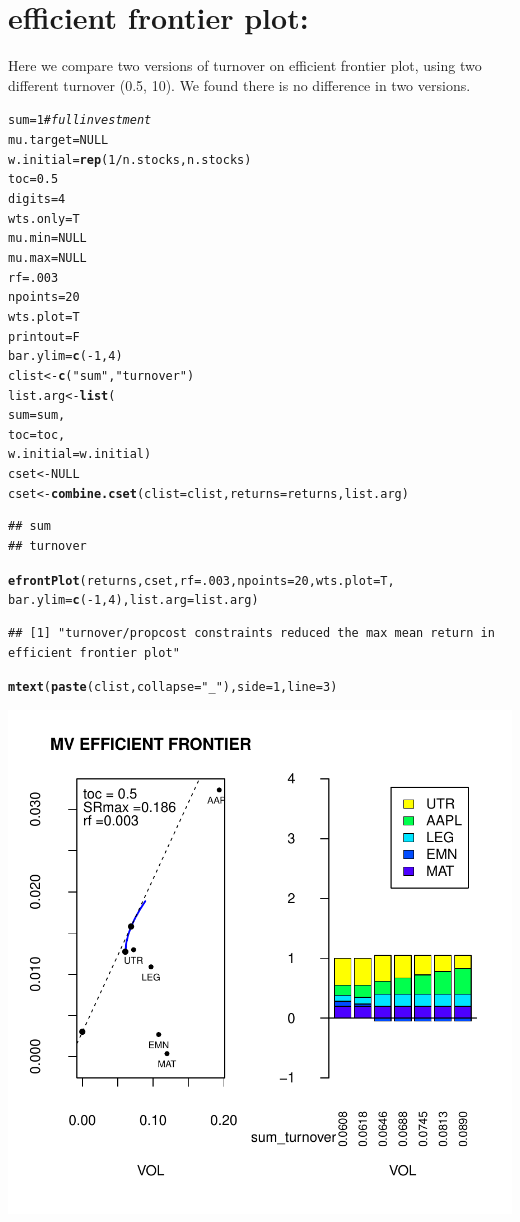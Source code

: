 \documentclass{uwstat518}\usepackage[]{graphicx}\usepackage[]{color}
\makeatletter
\def\maxwidth{ %
  \ifdim\Gin@nat@width>\linewidth
    \linewidth
  \else
    \Gin@nat@width
  \fi
}
\newcommand{\hlstr}[1]{\textcolor[rgb]{0.192,0.494,0.8}{#1}}%
\newcommand{\hlcom}[1]{\textcolor[rgb]{0.678,0.584,0.686}{\textit{#1}}}%
\newcommand{\hlkwd}[1]{\textcolor[rgb]{0.737,0.353,0.396}{\textbf{#1}}}%
\newenvironment{kframe}{%
 \def\at@end@of@kframe{}%
 \ifinner\ifhmode%
  \def\at@end@of@kframe{\end{minipage}}%
  \begin{minipage}{\columnwidth}%
 \fi\fi%
 \def\FrameCommand##1{\hskip\@totalleftmargin \hskip-\fboxsep
 \colorbox{shadecolor}{##1}\hskip-\fboxsep
     \hskip-\linewidth \hskip-\@totalleftmargin \hskip\columnwidth}%
 \MakeFramed {\advance\hsize-\width
   \@totalleftmargin\z@ \linewidth\hsize
   \@setminipage}}%
 {\par\unskip\endMakeFramed%
 \at@end@of@kframe}
\newenvironment{knitrout}{}{} %
\makeatother
\begin{document}
\section{efficient frontier plot:}

Here we compare two versions of turnover on efficient frontier plot, using two
different turnover (0.5, 10).
We found there is no difference in two versions. 

\begin{knitrout}
\color{fgcolor}\begin{kframe}
\begin{alltt}
sum=1 \hlcom{# full investment }
mu.target=NULL 
w.initial=\hlkwd{rep}(1/n.stocks,n.stocks) 
toc=0.5
digits=4
wts.only=T
mu.min = NULL 
mu.max = NULL 
rf = .003
npoints = 20
wts.plot = T 
printout = F
bar.ylim = \hlkwd{c}(-1,4)
clist <- \hlkwd{c}(\hlstr{"sum"},\hlstr{"turnover"})
list.arg <- \hlkwd{list}(	
			sum=sum,
			toc=toc,
			w.initial=w.initial)
cset <- NULL
cset <-\hlkwd{combine.cset}(clist=clist,returns=returns,list.arg)
\end{alltt}
\begin{verbatim}
## sum 
## turnover
\end{verbatim}
\begin{alltt}
\hlkwd{efrontPlot}(returns, cset, rf = .003, npoints = 20,wts.plot = T,
		bar.ylim = \hlkwd{c}(-1,4),list.arg=list.arg)
\end{alltt}
\begin{verbatim}
## [1] "turnover/propcost constraints reduced the max mean return in efficient frontier plot"
\end{verbatim}
\begin{alltt}
\hlkwd{mtext}(\hlkwd{paste}(clist,collapse=\hlstr{"_"}),side=1,line=3)
\end{alltt}
\end{kframe}
\includegraphics[width=\maxwidth]{figure/unnamed-chunk-61} 

\end{knitrout}
\end{document}
